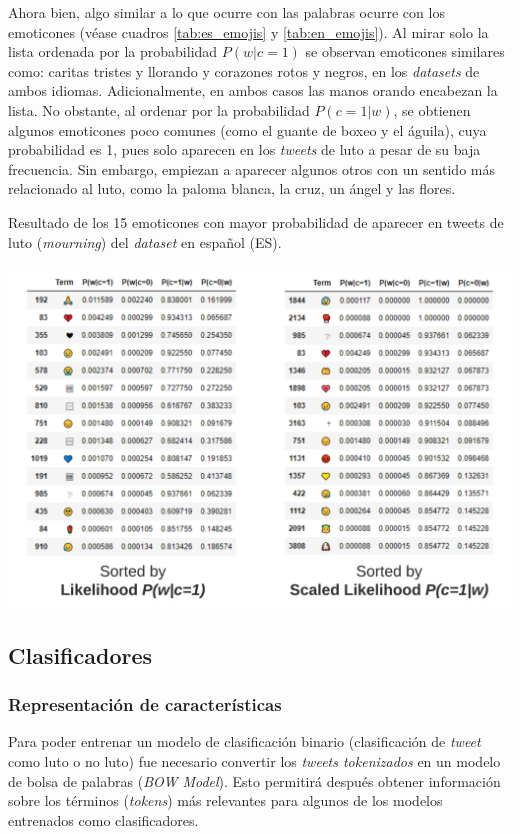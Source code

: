 Ahora bien, algo similar a lo que ocurre con las palabras ocurre con los emoticones (véase cuadros \ref{tab:es_emojis} y \ref{tab:en_emojis}). Al mirar solo la lista ordenada por la probabilidad $P(w|c=1)$ se observan emoticones similares como: caritas tristes y llorando y corazones rotos y negros, en los \textit{datasets} de ambos idiomas. Adicionalmente, en ambos casos las manos orando encabezan la lista. No obstante, al ordenar por la probabilidad $P(c=1|w)$, se obtienen algunos emoticones poco comunes (como el guante de boxeo y el águila), cuya probabilidad es 1, pues solo aparecen en los \textit{tweets} de luto a pesar de su baja frecuencia. Sin embargo, empiezan a aparecer algunos otros con un sentido más relacionado al luto, como la paloma blanca, la cruz, un ángel y las flores. 

\begin{table}[H]
    \centering
    \caption{Resultado de los 15 emoticones con mayor probabilidad de aparecer en tweets de luto (\textit{mourning}) del \textit{dataset} en español (ES).}
    \label{tab:en_emojis}
    \includegraphics[width=\textwidth]{doc/images/EN_Emojis.png}
\end{table}

\subsection{Clasificadores}

\subsubsection{Representación de características}

Para poder entrenar un modelo de clasificación binario (clasificación de \textit{tweet} como luto o no luto) fue necesario convertir los \textit{tweets tokenizados} en un modelo de bolsa de palabras (\textit{BOW Model}). Esto permitirá después obtener información sobre los términos (\textit{tokens}) más relevantes para algunos de los modelos entrenados como clasificadores. \\

